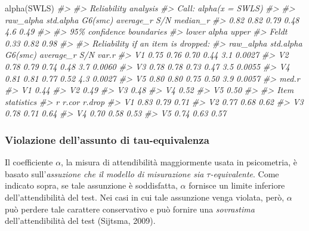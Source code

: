 \documentclass[
  11pt,
]{krantz}
\makeatletter
\newenvironment{Shaded}{\begin{snugshade}}{\end{snugshade}}
\newcommand{\CommentTok}[1]{\textcolor[rgb]{0.37,0.37,0.37}{\textit{#1}}}
\newcommand{\FunctionTok}[1]{\textcolor[rgb]{0,0,0}{#1}}
\newcommand{\NormalTok}[1]{#1}
\newenvironment{kframe}{%
\medskip{}
\setlength{\fboxsep}{.8em}
 \def\at@end@of@kframe{}%
 \ifinner\ifhmode%
  \def\at@end@of@kframe{\end{minipage}}%
  \begin{minipage}{\columnwidth}%
 \fi\fi%
 \def\FrameCommand##1{\hskip\@totalleftmargin \hskip-\fboxsep
 \colorbox{shadecolor}{##1}\hskip-\fboxsep
     \hskip-\linewidth \hskip-\@totalleftmargin \hskip\columnwidth}%
 \MakeFramed {\advance\hsize-\width
   \@totalleftmargin\z@ \linewidth\hsize
   \@setminipage}}%
 {\par\unskip\endMakeFramed%
 \at@end@of@kframe}
\renewenvironment{Shaded}{\begin{kframe}}{\end{kframe}}
\theoremstyle{definition}
\theoremstyle{definition}
\theoremstyle{definition}
\theoremstyle{definition}
\theoremstyle{remark}
\makeatother
\begin{document}
\begin{Shaded}
\begin{Highlighting}[]
\FunctionTok{alpha}\NormalTok{(SWLS)}
\CommentTok{\#\textgreater{} }
\CommentTok{\#\textgreater{} Reliability analysis   }
\CommentTok{\#\textgreater{} Call: alpha(x = SWLS)}
\CommentTok{\#\textgreater{} }
\CommentTok{\#\textgreater{}   raw\_alpha std.alpha G6(smc) average\_r S/N median\_r}
\CommentTok{\#\textgreater{}       0.82      0.82    0.79      0.48 4.6     0.49}
\CommentTok{\#\textgreater{} }
\CommentTok{\#\textgreater{}     95\% confidence boundaries }
\CommentTok{\#\textgreater{}       lower alpha upper}
\CommentTok{\#\textgreater{} Feldt  0.33  0.82  0.98}
\CommentTok{\#\textgreater{} }
\CommentTok{\#\textgreater{}  Reliability if an item is dropped:}
\CommentTok{\#\textgreater{}    raw\_alpha std.alpha G6(smc) average\_r S/N  var.r}
\CommentTok{\#\textgreater{} V1      0.75      0.76    0.70      0.44 3.1 0.0027}
\CommentTok{\#\textgreater{} V2      0.78      0.79    0.74      0.48 3.7 0.0060}
\CommentTok{\#\textgreater{} V3      0.78      0.78    0.73      0.47 3.5 0.0055}
\CommentTok{\#\textgreater{} V4      0.81      0.81    0.77      0.52 4.3 0.0027}
\CommentTok{\#\textgreater{} V5      0.80      0.80    0.75      0.50 3.9 0.0057}
\CommentTok{\#\textgreater{}    med.r}
\CommentTok{\#\textgreater{} V1  0.44}
\CommentTok{\#\textgreater{} V2  0.49}
\CommentTok{\#\textgreater{} V3  0.48}
\CommentTok{\#\textgreater{} V4  0.52}
\CommentTok{\#\textgreater{} V5  0.50}
\CommentTok{\#\textgreater{} }
\CommentTok{\#\textgreater{}  Item statistics }
\CommentTok{\#\textgreater{}       r r.cor r.drop}
\CommentTok{\#\textgreater{} V1 0.83  0.79   0.71}
\CommentTok{\#\textgreater{} V2 0.77  0.68   0.62}
\CommentTok{\#\textgreater{} V3 0.78  0.71   0.64}
\CommentTok{\#\textgreater{} V4 0.70  0.58   0.53}
\CommentTok{\#\textgreater{} V5 0.74  0.63   0.57}
\end{Highlighting}
\end{Shaded}

\hypertarget{sec:violazione_tau}{%
\subsubsection{Violazione dell'assunto di tau-equivalenza}\label{sec:violazione_tau}}

Il coefficiente \(\alpha\), la misura di attendibilità maggiormente usata in psicometria, è basato sull'\emph{assuzione che il modello di misurazione sia \(\tau\)-equivalente}. Come indicato sopra, se tale assunzione è soddisfatta, \(\alpha\) fornisce un limite inferiore dell'attendibilità del test. Nei casi in cui tale assunzione venga violata, però, \(\alpha\) può perdere tale carattere conservativo e può fornire una \emph{sovrastima} dell'attendibilità del test (Sijtsma, 2009).
\end{document}
